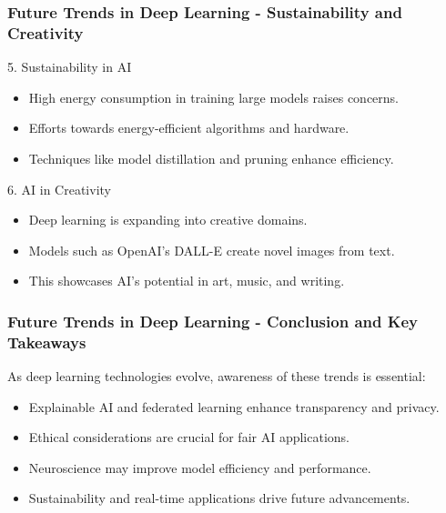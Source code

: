 \documentclass[aspectratio=169]{beamer}
\begin{document}
\begin{frame}[fragile]
    \frametitle{Future Trends in Deep Learning - Sustainability and Creativity}
    \begin{block}{5. Sustainability in AI}
        \begin{itemize}
            \item High energy consumption in training large models raises concerns.
            \item Efforts towards energy-efficient algorithms and hardware.
            \item Techniques like model distillation and pruning enhance efficiency.
        \end{itemize}
    \end{block}

    \begin{block}{6. AI in Creativity}
        \begin{itemize}
            \item Deep learning is expanding into creative domains.
            \item Models such as OpenAI's DALL-E create novel images from text.
            \item This showcases AI's potential in art, music, and writing.
        \end{itemize}
    \end{block}
\end{frame}

\begin{frame}[fragile]
    \frametitle{Future Trends in Deep Learning - Conclusion and Key Takeaways}
    As deep learning technologies evolve, awareness of these trends is essential:
    \begin{itemize}
        \item Explainable AI and federated learning enhance transparency and privacy.
        \item Ethical considerations are crucial for fair AI applications.
        \item Neuroscience may improve model efficiency and performance.
        \item Sustainability and real-time applications drive future advancements.
    \end{itemize}
\end{frame}
\end{document}
